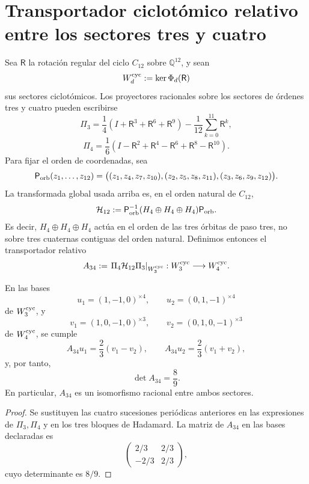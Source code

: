 \section{Transportador ciclotómico relativo entre los sectores tres y cuatro}
\label{sec:transportador-ciclotomico-a34-rev8}

Sea \(\mathsf R\) la rotación regular del ciclo \(C_{12}\) sobre
\(\mathbb Q^{12}\), y sean
\[
 W_d^{\rm cyc}:=\ker\Phi_d(\mathsf R)
\]
sus sectores ciclotómicos. Los proyectores racionales sobre los sectores de
órdenes tres y cuatro pueden escribirse
\[
 \Pi_3=
 \frac14(I+\mathsf R^3+\mathsf R^6+\mathsf R^9)
 -\frac1{12}\sum_{k=0}^{11}\mathsf R^k,
\]
\[
 \Pi_4=
 \frac16(I-\mathsf R^2+\mathsf R^4-\mathsf R^6
              +\mathsf R^8-\mathsf R^{10}).
\]
Para fijar el orden de coordenadas, sea
\[
 \mathsf P_{\rm orb}(z_1,\ldots,z_{12})
 =\bigl((z_1,z_4,z_7,z_{10}),
        (z_2,z_5,z_8,z_{11}),
        (z_3,z_6,z_9,z_{12})\bigr).
\]
La transformada global usada arriba es, en el orden natural de \(C_{12}\),
\[
 \mathcal H_{12}
 :=\mathsf P_{\rm orb}^{-1}
   (H_4\oplus H_4\oplus H_4)\mathsf P_{\rm orb}.
\]
Es decir, \(H_4\oplus H_4\oplus H_4\) actúa en el orden de las tres
órbitas de paso tres, no sobre tres cuaternas contiguas del orden natural.
Definimos entonces el transportador relativo
\[
 A_{34}:=\left.\Pi_4\mathcal H_{12}\Pi_3
          \right|_{W_3^{\rm cyc}}:
 W_3^{\rm cyc}\longrightarrow W_4^{\rm cyc}.
\]

\begin{theorem}
\label{thm:transportador-ciclotomico-a34-rev8}
En las bases
\[
 u_1=(1,-1,0)^{\times4},\qquad
 u_2=(0,1,-1)^{\times4}
\]
de \(W_3^{\rm cyc}\), y
\[
 v_1=(1,0,-1,0)^{\times3},\qquad
 v_2=(0,1,0,-1)^{\times3}
\]
de \(W_4^{\rm cyc}\), se cumple
\[
 A_{34}u_1=\frac23(v_1-v_2),\qquad
 A_{34}u_2=\frac23(v_1+v_2),
\]
y, por tanto,
\[
 \boxed{\det A_{34}=\frac89}.
\]
En particular, \(A_{34}\) es un isomorfismo racional entre ambos sectores.
\end{theorem}

\begin{proof}
Se sustituyen las cuatro sucesiones periódicas anteriores en las expresiones
de \(\Pi_3,\Pi_4\) y en los tres bloques de Hadamard. La matriz de \(A_{34}\)
en las bases declaradas es
\[
 \begin{pmatrix}
  2/3&2/3\\
 -2/3&2/3
 \end{pmatrix},
\]
cuyo determinante es \(8/9\).
\end{proof}

